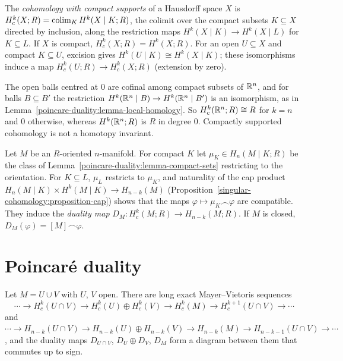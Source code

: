 \begin{definition}\label{poincare-duality:definition-compact-supports}
The \emph{cohomology with compact supports} of a Hausdorff space $X$ is $H^k_c(X; R) = \operatorname*{colim}_K H^k(X \mid K; R)$, the colimit over the compact subsets $K \subseteq X$
directed by inclusion, along the restriction maps $H^k(X \mid K) \to H^k(X \mid L)$ for $K \subseteq L$. If $X$ is compact, $H^k_c(X; R) = H^k(X; R)$. For an open
$U \subseteq X$ and compact $K \subseteq U$, excision gives $H^k(U \mid K) \cong H^k(X \mid K)$; these isomorphisms induce a map $H^k_c(U; R) \to H^k_c(X; R)$ (extension by zero).
\end{definition}

\begin{example}\label{poincare-duality:example-compact-supports-rn}
The open balls centred at $0$ are cofinal among compact subsets of $\mathbb{R}^n$, and for balls $B \subseteq B'$ the restriction $H^k(\mathbb{R}^n \mid B) \to H^k(\mathbb{R}^n \mid B')$ is an
isomorphism, as in Lemma~\ref{poincare-duality:lemma-local-homology}. So $H^k_c(\mathbb{R}^n; R) \cong R$ for $k = n$ and $0$ otherwise, whereas $H^k(\mathbb{R}^n; R)$ is $R$ in degree $0$.
Compactly supported cohomology is not a homotopy invariant.
\end{example}

\begin{definition}\label{poincare-duality:definition-duality-map}
Let $M$ be an $R$-oriented $n$-manifold. For compact $K$ let $\mu_K \in H_n(M \mid K; R)$ be the class of Lemma~\ref{poincare-duality:lemma-compact-sets} restricting to the
orientation. For $K \subseteq L$, $\mu_L$ restricts to $\mu_K$, and naturality of the cap product
$H_n(M \mid K) \times H^k(M \mid K) \to H_{n-k}(M)$ (Proposition~\ref{singular-cohomology:proposition-cap}) shows that the maps $\varphi \mapsto \mu_K \frown \varphi$ are compatible.
They induce the \emph{duality map} $D_M \colon H^k_c(M; R) \to H_{n-k}(M; R)$. If $M$ is closed, $D_M(\varphi) = [M] \frown \varphi$.
\end{definition}

\section{Poincar\'e duality}\label{poincare-duality:section-poincare-duality}

\begin{lemma}\label{poincare-duality:lemma-mayer-vietoris-duality}
Let $M = U \cup V$ with $U$, $V$ open. There are long exact Mayer--Vietoris sequences
\[
\cdots \to H^k_c(U \cap V) \to H^k_c(U) \oplus H^k_c(V) \to H^k_c(M) \to H^{k+1}_c(U \cap V) \to \cdots
\]
and $\cdots \to H_{n-k}(U \cap V) \to H_{n-k}(U) \oplus H_{n-k}(V) \to H_{n-k}(M) \to H_{n-k-1}(U \cap V) \to \cdots$, and the duality maps $D_{U \cap V}$, $D_U \oplus D_V$, $D_M$
form a diagram between them that commutes up to sign.
\end{lemma}

